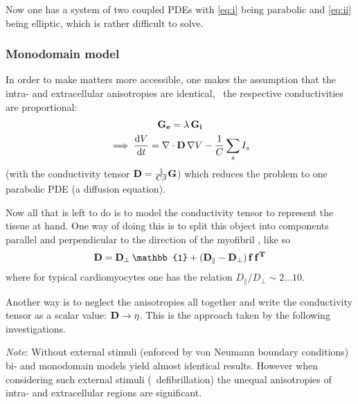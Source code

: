 Now one has a system of two coupled PDEs with \eqref{eq:i} being parabolic
and \eqref{eq:ii} being elliptic, which is rather difficult to solve.

\subsubsection{Monodomain model}
In order to make matters more accessible, one makes the assumption that the
intra- and extracellular anisotropies are identical, \ie~the respective
conductivities are proportional:
\begin{gather}
    \mathbf{G_e}=\lambda\,\mathbf{G_i} \nonumber \\ \implies
    \dv{V}{t}=\nabla\cdot\mathbf{D}\,\nabla{V}-\frac{1}{C}\sum_{s}I_{s}
    \label{eq:divcap}
\end{gather}
(with the conductivity tensor $\mathbf{D}=\frac{1}{C\beta}\mathbf{G}$)
which reduces the problem to one parabolic PDE (a diffusion equation).

Now all that is left to do is to model the conductivity tensor  to
represent the tissue at hand.
One way of doing this is to split this object
into components parallel and perpendicular to the direction of the
myofibril , like so
\begin{equation*}
    \myten{D}=\myten{D_{\perp}}\,\mathbb{1}+(\myten{D_{\parallel}}
    -\myten{D_{\perp}})\,\myvec{f}\,\myvec{f^T}
\end{equation*}
where for typical cardiomyocytes one has the relation
$D_{\parallel}/D_{\perp}\sim2\ldots10$.

Another way is to neglect the anisotropies all together and write the
conductivity tensor as a scalar value: $\mathbf{D}\to\eta$. This is the
approach taken by the following investigations.

\vspace{\baselineskip}
\emph{Note}: Without external stimuli (enforced by von Neumann boundary
conditions) bi- and monodomain models yield almost identical results.
However when considering such external stimuli (\eg~defibrillation) the
unequal anisotropies of intra- and extracellular regions are significant.


